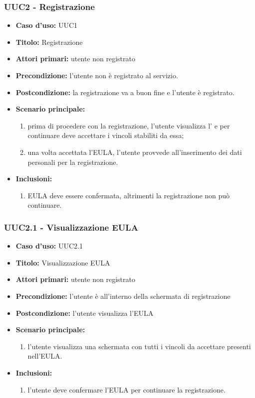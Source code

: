 \documentclass[casi-duso]{subfiles}
\begin{document}
\subsubsection{UUC2 - Registrazione}
\label{subsub:UUC2utente}
\begin{itemize}
  \item \textbf{Caso d’uso:} UUC1 
  \item \textbf{Titolo:} Registrazione
  \item \textbf{Attori primari:} utente non registrato
  \item \textbf{Precondizione:} l'utente non è registrato al servizio.
  \item \textbf{Postcondizione:} la registrazione va a buon fine e l'utente è registrato.
  \item \textbf{Scenario principale:} 
  \begin{enumerate}
    \item prima di procedere con la registrazione, l'utente visualizza l' e per continuare deve accettare i vincoli stabiliti da essa;
    \item una volta accettata l'EULA, l'utente provvede all'inserimento dei dati personali per la registrazione.
  \end{enumerate}  
  \item \textbf{Inclusioni:} 
  \begin{enumerate}
    \item EULA deve essere confermata, altrimenti la registrazione non può continuare.
  \end{enumerate}  
\end{itemize}

\subsubsection{UUC2.1 - Visualizzazione EULA}
\label{subsub:UUC2.1utente}
\begin{itemize}
  \item \textbf{Caso d’uso:} UUC2.1 
  \item \textbf{Titolo:} Visualizzazione EULA
  \item \textbf{Attori primari:} utente non registrato
  \item \textbf{Precondizione:} l'utente è all'interno della schermata di registrazione
  \item \textbf{Postcondizione:} l'utente visualizza l'EULA
  \item \textbf{Scenario principale:} 
  \begin{enumerate}
    \item l'utente visualizza una schermata con tutti i vincoli da accettare presenti nell'EULA.
  \end{enumerate}  
  \item \textbf{Inclusioni:} 
  \begin{enumerate}
    \item l'utente deve confermare l'EULA per continuare la registrazione.
  \end{enumerate}     
\end{itemize}
\end{document}

